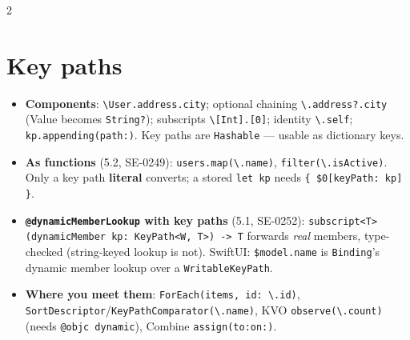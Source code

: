 \documentclass[8pt]{extarticle}
\begin{document}
\begin{multicols}{2}
\raggedright

\section{Key paths}
\begin{itemize}
  \item \textbf{Components}: \texttt{\textbackslash User.address.city}; optional chaining
        \texttt{\textbackslash.address?.city} (Value becomes \texttt{String?}); subscripts
        \texttt{\textbackslash[Int].[0]}; identity \texttt{\textbackslash.self};
        \texttt{kp.appending(path:)}. Key paths are \texttt{Hashable} — usable as dictionary keys.
  \item \textbf{As functions} (5.2, SE-0249): \texttt{users.map(\textbackslash.name)},
        \texttt{filter(\textbackslash.isActive)}. Only a key path \textbf{literal} converts; a
        stored \texttt{let kp} needs \texttt{\{ \$0[keyPath: kp] \}}.
  \item \textbf{\texttt{@dynamicMemberLookup} with key paths} (5.1, SE-0252):
        \texttt{subscript<T>(dynamicMember kp: KeyPath<W, T>) -> T} forwards \emph{real}
        members, type-checked (string-keyed lookup is not). SwiftUI: \texttt{\$model.name} is
        \texttt{Binding}'s dynamic member lookup over a \texttt{WritableKeyPath}.
  \item \textbf{Where you meet them}: \texttt{ForEach(items, id: \textbackslash.id)},
        \texttt{SortDescriptor}/\texttt{KeyPathComparator(\textbackslash.name)}, KVO
        \texttt{observe(\textbackslash.count)} (needs \texttt{@objc dynamic}), Combine
        \texttt{assign(to:on:)}.
\end{itemize}


\end{multicols}
\end{document}
